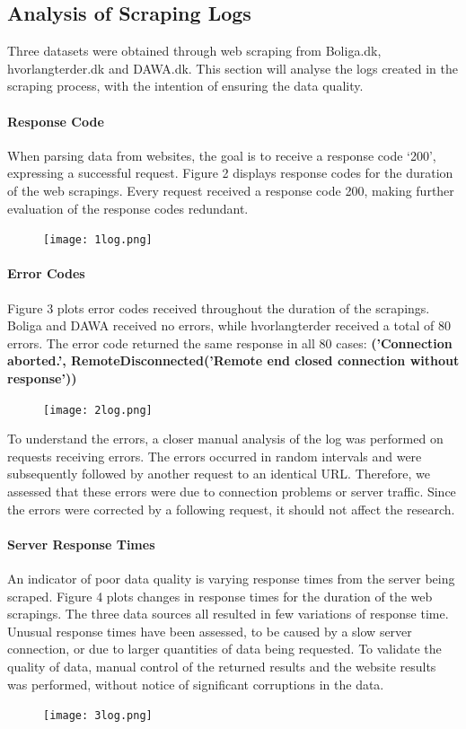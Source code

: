 \documentclass[12pt,a4paper]{article}
\begin{document}
\subsection{Analysis of Scraping Logs}
Three datasets were obtained through web scraping from Boliga.dk, hvorlangterder.dk and DAWA.dk. This section will analyse the logs created in the scraping process, with the intention of ensuring the data quality.
\paragraph{Response Code\newline}
When parsing data from websites, the goal is to receive a response code ‘200’, expressing a successful request. Figure 2 displays response codes for the duration of the web scrapings. Every request received a response code 200, making further evaluation of the response codes redundant.
\begin{figure}[H]
  \centering
   \caption{}
   \texttt{[image: 1log.png]} 
  \label{fig:}
\end{figure}

\paragraph{Error Codes\newline}
Figure 3 plots error codes received throughout the duration of the scrapings. Boliga and DAWA received no errors, while hvorlangterder received a total of 80 errors. The error code returned the same response in all 80 cases: \small{\textbf{('Connection aborted.', RemoteDisconnected('Remote end closed connection without response'))}}
\normalsize
\begin{figure}[H]
  \centering
   \caption{}
   \texttt{[image: 2log.png]} 
  \label{fig:}
\end{figure}
To understand the errors, a closer manual analysis of the log was performed on requests receiving errors. The errors occurred in random intervals and were subsequently followed by another request to an identical URL. Therefore, we assessed that these errors were due to connection problems or server traffic. Since the errors were corrected by a following request, it should not affect the research.

\paragraph{Server Response Times\newline}
An indicator of poor data quality is varying response times from the server being scraped. Figure 4 plots changes in response times for the duration of the web scrapings. The three data sources all resulted in few variations of response time. Unusual response times have been assessed, to be caused by a slow server connection, or due to larger quantities of data being requested. To validate the quality of data, manual control of the returned results and the website results was performed, without notice of significant corruptions in the data.
\begin{figure}[H]
  \centering
   \caption{}
   \texttt{[image: 3log.png]} 
  \label{fig:}
\end{figure}
\end{document}
